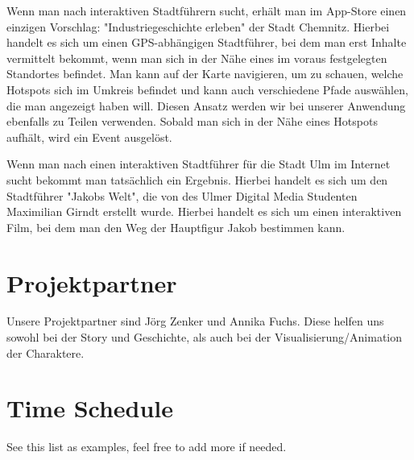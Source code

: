 \documentclass[]{hci-proposal}
\begin{document}
Wenn man nach interaktiven Stadtführern sucht, erhält man im App-Store einen einzigen Vorschlag: "Industriegeschichte erleben" der
Stadt Chemnitz. Hierbei handelt es sich um einen GPS-abhängigen Stadtführer, bei dem man erst Inhalte vermittelt bekommt, wenn man sich
in der Nähe eines im voraus festgelegten Standortes befindet. Man kann auf der Karte navigieren, um zu schauen, welche Hotspots
sich im Umkreis befindet und kann auch verschiedene Pfade auswählen, die man angezeigt haben will.
Diesen Ansatz werden wir bei unserer Anwendung ebenfalls zu Teilen verwenden. Sobald man sich in der Nähe eines Hotspots aufhält,
wird ein Event ausgelöst.

Wenn man nach einen interaktiven Stadtführer für die Stadt Ulm im Internet sucht bekommt man tatsächlich ein Ergebnis. Hierbei handelt
es sich um den Stadtführer "Jakobs Welt", die von des Ulmer Digital Media Studenten Maximilian Girndt erstellt wurde. Hierbei
handelt es sich um einen interaktiven Film, bei dem man den Weg der Hauptfigur Jakob bestimmen kann.


\section{Projektpartner}
Unsere Projektpartner sind Jörg Zenker und Annika Fuchs. Diese helfen uns sowohl bei der Story und Geschichte,
als auch bei der Visualisierung/Animation der Charaktere.

\section{Time Schedule}
See this list as examples, feel free to add more if needed.
\end{document}
